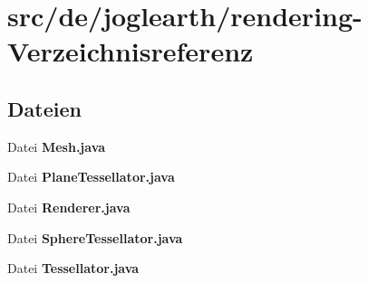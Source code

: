 \section{src/de/joglearth/rendering-\/\-Verzeichnisreferenz}
\label{dir_d59a6d369409d216d7501eca6684a691}
\subsection*{Dateien}
\begin{DoxyCompactItemize}
\item 
Datei {\bfseries Mesh.\-java}
\item 
Datei {\bfseries Plane\-Tessellator.\-java}
\item 
Datei {\bfseries Renderer.\-java}
\item 
Datei {\bfseries Sphere\-Tessellator.\-java}
\item 
Datei {\bfseries Tessellator.\-java}
\end{DoxyCompactItemize}
